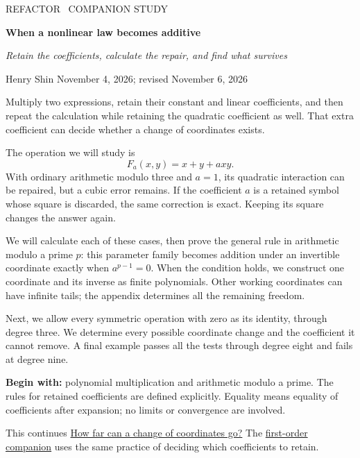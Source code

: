 \documentclass[11pt,letterpaper]{article}
\numberwithin{equation}{section}
\theoremstyle{definition}\newtheorem{example}[theorem]{Example}
\begin{document}
\color{ink}
\thispagestyle{empty}
{\sffamily\small\textcolor{accent}{REFACTOR \textperiodcentered\ COMPANION STUDY}\par}
\vspace{.6em}
{\LARGE\bfseries When a nonlinear law becomes additive\par}
\vspace{.4em}
{\large\itshape Retain the coefficients, calculate the repair, and find what survives\par}
\vspace{.7em}
{Henry Shin \hspace{.6em}\textperiodcentered\hspace{.6em} November 4, 2026; revised November 6, 2026\par}
\vspace{.6em}

Multiply two expressions, retain their constant and linear coefficients, and then repeat the calculation while retaining the quadratic coefficient as well. That extra coefficient can decide whether a change of coordinates exists.

The operation we will study is
\[
 F_a(x,y)=x+y+a xy.
\]
With ordinary arithmetic modulo three and \(a=1\), its quadratic interaction can be repaired, but a cubic error remains. If the coefficient \(a\) is a retained symbol whose square is discarded, the same correction is exact. Keeping its square changes the answer again.

We will calculate each of these cases, then prove the general rule in arithmetic modulo a prime \(p\): this parameter family becomes addition under an invertible coordinate exactly when \(a^{p-1}=0\). When the condition holds, we construct one coordinate and its inverse as finite polynomials. Other working coordinates can have infinite tails; the appendix determines all the remaining freedom.

Next, we allow every symmetric operation with zero as its identity, through degree three. We determine every possible coordinate change and the coefficient it cannot remove. A final example passes all the tests through degree eight and fails at degree nine.

\textbf{Begin with:} polynomial multiplication and arithmetic modulo a prime. The rules for retained coefficients are defined explicitly. Equality means equality of coefficients after expansion; no limits or convergence are involved.

\vspace{.3em}
{\small This continues \href{https://refactor.press/refactors/coordinate-repair}{How far can a change of coordinates go?} The \href{https://refactor.press/refactors/first-order}{first-order companion} uses the same practice of deciding which coefficients to retain.}

\clearpage
\tableofcontents
\clearpage


\appendix


\end{document}
